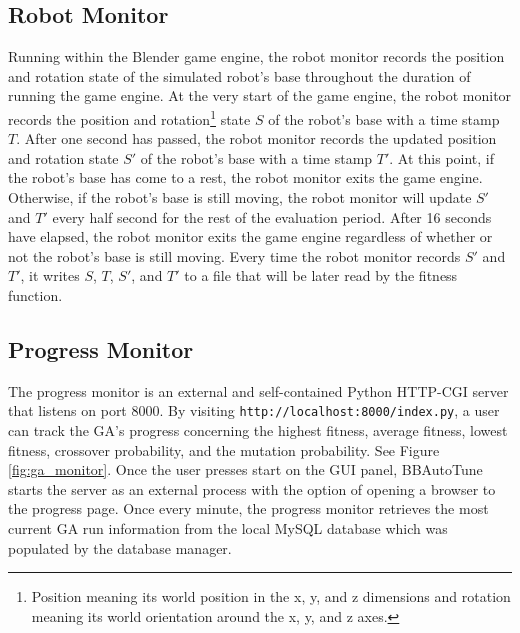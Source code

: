 \subsection{Robot Monitor}

Running within the Blender game engine, the robot monitor records the position and rotation state of the simulated robot's base throughout the duration of running the game engine. At the very start of the game engine, the robot monitor records the position and rotation\footnote{Position meaning its world position in the x, y, and z dimensions and rotation meaning its world orientation around the x, y, and z axes.} state $S$ of the robot's base with a time stamp $T$. After one second has passed, the robot monitor records the updated position and rotation state $S'$ of the robot's base with a time stamp $T'$. At this point, if the robot's base has come to a rest, the robot monitor exits the game engine. Otherwise, if the robot's base is still moving, the robot monitor will update $S'$ and $T'$ every half second for the rest of the evaluation period. After 16 seconds have elapsed, the robot monitor exits the game engine regardless of whether or not the robot's base is still moving. Every time the robot monitor records $S'$ and $T'$, it writes $S$, $T$, $S'$, and $T'$ to a file that will be later read by the fitness function.  

\subsection{Progress Monitor}

The progress monitor is an external and self-contained Python HTTP-CGI server that listens on port 8000. By visiting  \texttt{http://localhost:8000/index.py}, a user can track the GA's progress concerning the highest fitness, average fitness, lowest fitness, crossover probability, and the mutation probability. See Figure \ref{fig:ga_monitor}. Once the user presses start on the GUI panel, BBAutoTune starts the server as an external process with the option of opening a browser to the progress page. Once every minute, the progress monitor retrieves the most current GA run information from the local MySQL database which was populated by the database manager.

